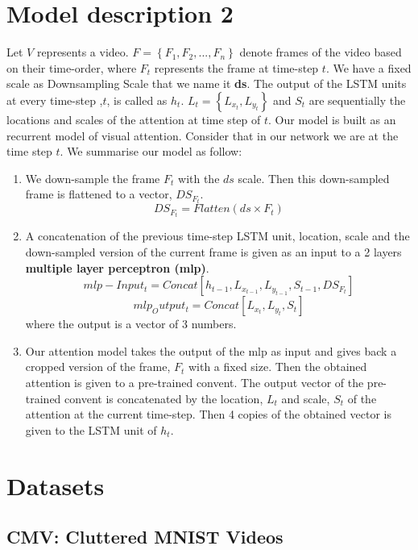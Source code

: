 \documentclass{article} %
\begin{document}
\section{Model description 2}
Let $V$ represents a video. $F=\left \{ F_{1}, F_{2}, ..., F_{n} \right \}$ denote frames of the video based on their time-order, where $F_{t}$ represents the frame at time-step $t$. We have a fixed scale as Downsampling Scale that we name it \textbf{ds}. The output of the LSTM units at every time-step ,$t$, is called as $h_{t}$. $L_{t}=\left \{ L_{x_{t}},L_{y_{t}} \right \}$ and $S_{t}$ are sequentially the locations and scales of the attention at time step of $t$.
Our model is built as an recurrent model of visual attention. Consider that in our network we are at the time step $t$. We summarise our model as follow:
\begin{enumerate}
\item We down-sample the frame $F_{t}$ with the $ds$ scale. Then this down-sampled frame is flattened to a vector, $DS_{F_{t}}$.
\begin{equation}
DS_{F_{t}}=Flatten(ds\times F_{t})
\end{equation} 
\item A concatenation of the previous time-step LSTM unit, location, scale and the down-sampled version of the current frame is given as an input to a 2 layers \textbf{multiple layer perceptron (mlp)}.
\begin{equation}
mlp-Input_{t}=Concat\left [h_{t-1}, L_{x_{t-1}},L_{y_{t-1}}, S_{t-1}, DS_{F_{t}}\right]
\end{equation} 
\begin{equation}
mlp_Output_{t}=Concat\left [ L_{x_{t}}, L_{y_{t}}, S_{t}\right]
\end{equation}
where the output is a vector of 3 numbers.
\item Our attention model takes the output of the mlp as input and gives back a cropped version of the frame, $F_{t}$ with a fixed size. Then the obtained attention is given to a pre-trained convent. The output vector of the pre-trained convent is concatenated by the location, $L_{t}$ and scale, $S_{t}$ of the attention at the current time-step. Then 4 copies of the obtained vector is given to the LSTM unit of $h_{t}$.
\end{enumerate}
\section{Datasets}
\subsection{CMV: Cluttered MNIST Videos}
\end{document}
